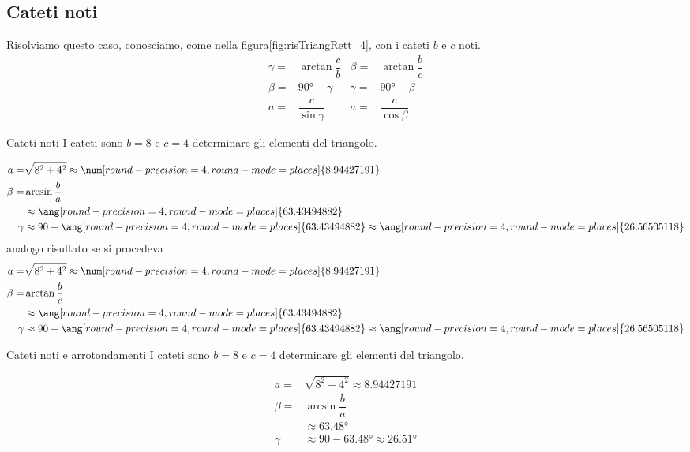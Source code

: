 \subsection{Cateti noti}
Risolviamo questo caso, conosciamo, come nella figura\nobs\vref{fig:risTriangRett_4}, con i cateti $b$ e $c$ noti.
\begin{align*}
\gamma=&\arctan\dfrac{c}{b}&\beta=&\arctan\dfrac{b}{c}\\
\beta=&\ang{90}-\gamma&\gamma=&\ang{90}-\beta\\
a=&\dfrac{c}{\sin\gamma}&a=&\dfrac{c}{\cos\beta}
\end{align*}
\begin{esempiot}{Cateti noti}{}
I cateti sono $b=8$ e $c=4$ determinare gli elementi del triangolo.
\end{esempiot}
\begin{align*}
	a=&\sqrt{8^2+4^2}\approx\num[round-precision=\lungarrotandamento,round-mode=places]{8.94427191}\\
	\beta=&\arcsin\dfrac{b}{a}\\
	&\approx\ang[round-precision=\lungarrotandamento,round-mode=places]{63.43494882}\\
	\gamma&\approx90-\ang[round-precision=\lungarrotandamento,round-mode=places]{63.43494882}\approx\ang[round-precision=\lungarrotandamento,round-mode=places]{26.56505118}\\
\end{align*}
analogo risultato se si procedeva
\begin{align*}
a=&\sqrt{8^2+4^2}\approx\num[round-precision=\lungarrotandamento,round-mode=places]{8.94427191}\\
\beta=&\arctan\dfrac{b}{c}\\
&\approx\ang[round-precision=\lungarrotandamento,round-mode=places]{63.43494882}\\
\gamma&\approx90-\ang[round-precision=\lungarrotandamento,round-mode=places]{63.43494882}\approx\ang[round-precision=\lungarrotandamento,round-mode=places]{26.56505118}\\
\end{align*}
\begin{cesempiot}{Cateti noti e arrotondamenti}{}
	I cateti sono $b=8$ e $c=4$ determinare gli elementi del triangolo.
\end{cesempiot}
\begin{align*}
a=&\sqrt{8^2+4^2}\approx\num[round-precision=2,round-mode=places]{8.94427191}\\
\beta=&\arcsin\dfrac{b}{a}\\
&\approx\ang[round-precision=2,round-mode=places]{63.48}\\
\gamma&\approx90-\ang[round-precision=2,round-mode=places]{63.48}\approx\ang[round-precision=2,round-mode=places]{26.51}\\
\end{align*}
